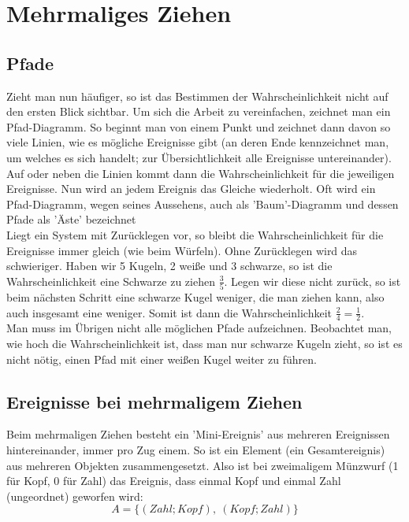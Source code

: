 \section{Mehrmaliges Ziehen}

\subsection{Pfade}
Zieht man nun häufiger, so ist das Bestimmen der Wahrscheinlichkeit nicht auf den ersten Blick sichtbar. Um sich die Arbeit zu vereinfachen, zeichnet man ein Pfad-Diagramm. So beginnt man von einem Punkt und zeichnet dann davon so viele Linien, wie es mögliche Ereignisse gibt (an deren Ende kennzeichnet man, um welches es sich handelt; zur Übersichtlichkeit alle Ereignisse untereinander). Auf oder neben die Linien kommt dann die Wahrscheinlichkeit für die jeweiligen Ereignisse. Nun wird an jedem Ereignis das Gleiche wiederholt. Oft wird ein Pfad-Diagramm, wegen seines Aussehens, auch als 'Baum'-Diagramm und dessen Pfade als 'Äste' bezeichnet\\
Liegt ein System mit Zurücklegen vor, so bleibt die Wahrscheinlichkeit für die Ereignisse immer gleich (wie beim Würfeln). Ohne Zurücklegen wird das schwieriger. Haben wir 5 Kugeln, 2 weiße und 3 schwarze, so ist die Wahrscheinlichkeit eine Schwarze zu ziehen \(\frac{3}{5}\). Legen wir diese nicht zurück, so ist beim nächsten Schritt eine schwarze Kugel weniger, die man ziehen kann, also auch insgesamt eine weniger. Somit ist dann die Wahrscheinlichkeit \(\frac{2}{4}=\frac{1}{2}\).\\
Man muss im Übrigen nicht alle möglichen Pfade aufzeichnen. Beobachtet man, wie hoch die Wahrscheinlichkeit ist, dass man nur schwarze Kugeln zieht, so ist es nicht nötig, einen Pfad mit einer weißen Kugel weiter zu führen.

\subsection{Ereignisse bei mehrmaligem Ziehen}
Beim mehrmaligen Ziehen besteht ein 'Mini-Ereignis' aus mehreren Ereignissen hintereinander, immer pro Zug einem. So ist ein Element (ein Gesamtereignis) aus mehreren Objekten zusammengesetzt. Also ist bei zweimaligem Münzwurf (1 für Kopf, 0 für Zahl) das Ereignis, dass einmal Kopf und einmal Zahl (ungeordnet) geworfen wird:
\[A=\lbrace (Zahl;Kopf),\ (Kopf;Zahl)\rbrace\]

